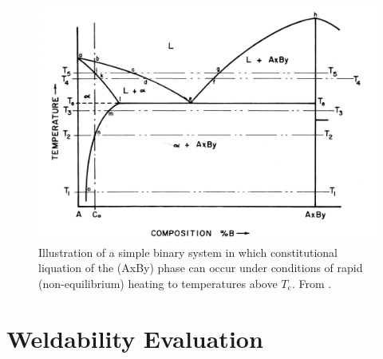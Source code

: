 \begin{figure}
    \includegraphics[width=6in]{figures/pepe-liquation-diagram.png}
    \caption{Illustration of a simple binary system in which constitutional liquation of the (AxBy) phase can occur under conditions of rapid (non-equilibrium) heating to temperatures above $T_e$. From \citet{pepe_effects_1967}.}
    \label{pepe-liquation-diagram}
\end{figure}




\section{Weldability Evaluation} \label{sec:weldability-evaluation}

